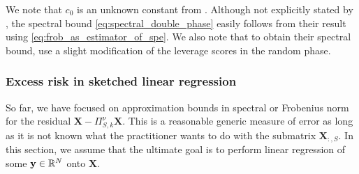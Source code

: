 \documentclass[twoside,11pt]{book}
\newcommand{\rev}[1]{\textcolor{black}{#1}}
\numberwithin{theorem}{chapter}
\numberwithin{definition}{chapter}
\numberwithin{proposition}{chapter}
\numberwithin{corollary}{chapter}
\numberwithin{example}{chapter}
\numberwithin{lemma}{chapter}
\numberwithin{assumption}{chapter}
\numberwithin{equation}{chapter}
\numberwithin{figure}{chapter}
\begin{document}
We note that $c_{0}$ is an unknown constant from \cite{RuVe07}. Although not explicitly stated by \cite{BoMaDr09}, the spectral bound \eqref{eq:spectral_double_phase} easily follows from their result using \eqref{eq:frob_as_estimator_of_spe}. We also note that to obtain their spectral bound, \cite{BoMaDr09} use a slight modification of the leverage scores in the random phase.

\subsubsection{Excess risk in sketched linear regression}
\label{s:related_work_sparse_regression}
So far, we have focused on approximation bounds in spectral or Frobenius norm for the residual $\bm{X}-\Pi_{S,k}^\nu\bm{X}$. This is a reasonable generic measure of error as long as it is not known what the practitioner wants to do with the submatrix $\bm{X}_{:,S}$. In this section, we assume that the ultimate goal is to perform linear regression of some ${\bf y}\in\mathbb{R}^N$ onto $\bm{X}$.

\end{document}
